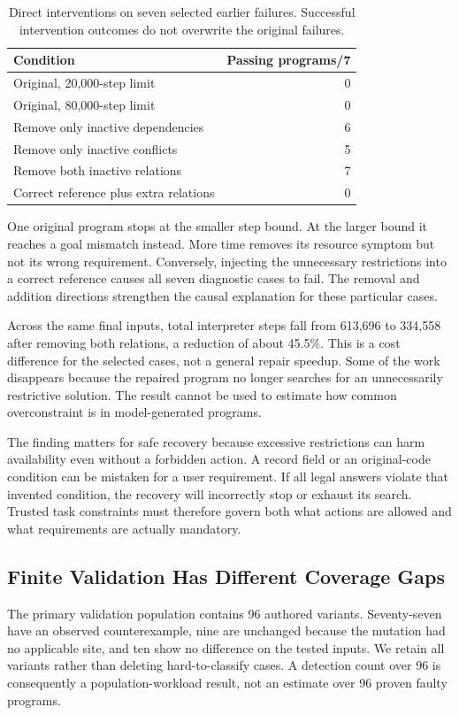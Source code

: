 \documentclass[conference]{IEEEtran}
\newcommand{\smalltable}{\fontsize{8}{9.5}\selectfont}
\begin{document}
\begin{table}[t]
\centering\smalltable
\caption{Direct interventions on seven selected earlier failures. Successful intervention outcomes do not overwrite the original failures.}
\label{tab:causal}
\begin{tabular}{p{5.5cm}r}
\toprule
Condition & Passing programs/7 \\
\midrule
Original, 20,000-step limit & 0 \\
Original, 80,000-step limit & 0 \\
Remove only inactive dependencies & 6 \\
Remove only inactive conflicts & 5 \\
Remove both inactive relations & 7 \\
Correct reference plus extra relations & 0 \\
\bottomrule
\end{tabular}
\end{table}

One original program stops at the smaller step bound. At the larger bound it reaches a goal mismatch instead. More time removes its resource symptom but not its wrong requirement. Conversely, injecting the unnecessary restrictions into a correct reference causes all seven diagnostic cases to fail. The removal and addition directions strengthen the causal explanation for these particular cases.

Across the same final inputs, total interpreter steps fall from 613,696 to 334,558 after removing both relations, a reduction of about 45.5\%. This is a cost difference for the selected cases, not a general repair speedup. Some of the work disappears because the repaired program no longer searches for an unnecessarily restrictive solution. The result cannot be used to estimate how common overconstraint is in model-generated programs.

The finding matters for safe recovery because excessive restrictions can harm availability even without a forbidden action. A record field or an original-code condition can be mistaken for a user requirement. If all legal answers violate that invented condition, the recovery will incorrectly stop or exhaust its search. Trusted task constraints must therefore govern both what actions are allowed and what requirements are actually mandatory.

\subsection{Finite Validation Has Different Coverage Gaps}
The primary validation population contains 96 authored variants. Seventy-seven have an observed counterexample, nine are unchanged because the mutation had no applicable site, and ten show no difference on the tested inputs. We retain all variants rather than deleting hard-to-classify cases. A detection count over 96 is consequently a population-workload result, not an estimate over 96 proven faulty programs.
\end{document}
